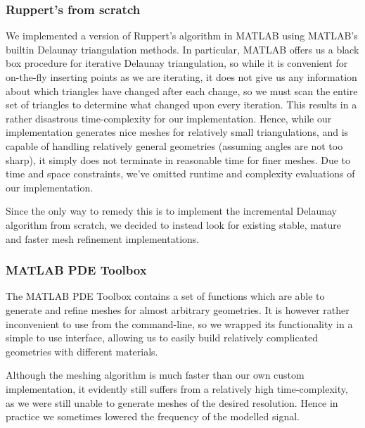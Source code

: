 \documentclass[10pt,a4paper]{article}
\begin{document}
\subsubsection*{Ruppert's from scratch}
We implemented a version of Ruppert's algorithm in MATLAB using MATLAB's builtin Delaunay triangulation methods. In particular, MATLAB offers us a black box procedure for iterative Delaunay triangulation, so while it is convenient for on-the-fly inserting points as we are iterating, it does not give us any information about which triangles have changed after each change, so we must scan the entire set of triangles to determine what changed upon every iteration. This results in a rather disastrous time-complexity for our implementation.
Hence, while our implementation generates nice meshes for relatively small triangulations, and is capable of handling relatively general geometries (assuming angles are not too sharp), it simply does not terminate in reasonable time for finer meshes. Due to time and space constraints, we've omitted runtime and complexity evaluations of our implementation. 

Since the only way to remedy this is to implement the incremental Delaunay algorithm from scratch, we decided to instead look for existing stable, mature and faster mesh refinement implementations.

\subsubsection*{MATLAB PDE Toolbox}
The MATLAB PDE Toolbox contains a set of functions which are able to generate and refine meshes for almost arbitrary geometries. It is however rather inconvenient to use from the command-line, so we wrapped its functionality in a simple to use interface, allowing us to easily build relatively complicated geometries with different materials.

Although the meshing algorithm is much faster than our own custom implementation, it evidently still suffers from a relatively high time-complexity, as we were still unable to generate meshes of the desired resolution. Hence in practice we sometimes lowered the frequency of the modelled signal.
\end{document}

